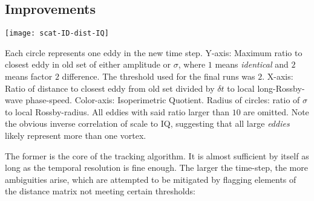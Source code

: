 \subsection{Improvements}
 \begin{marginfigure}
	\texttt{[image: scat-ID-dist-IQ]}
	\caption{Each circle represents one eddy in the new time step. Y-axis: Maximum ratio to closest eddy in old set of either amplitude or $\sigma$, where $1$ means \textit{identical} and $2$ means factor $2$ difference. The threshold used for the final runs was $2$. X-axis: Ratio of distance to closest eddy from old set divided by $\delta t$ to local long-Rossby-wave phase-speed. Color-axis: Isoperimetric Quotient. Radius of circles: ratio of $\sigma$ to local Rossby-radius. All eddies with said ratio larger than $10$ are omitted. Note the obvious inverse correlation of scale to IQ, suggesting that all large \textit{eddies} likely represent more than one vortex. }
	\label{fig:scat-ID-dist-IQ}
\end{marginfigure}
The former is the core of the tracking algorithm. It is almost sufficient by itself as long as the temporal resolution is fine enough. The larger the time-step, the more ambiguities arise, which are attempted to be mitigated by flagging elements of the distance matrix not meeting certain thresholds:

